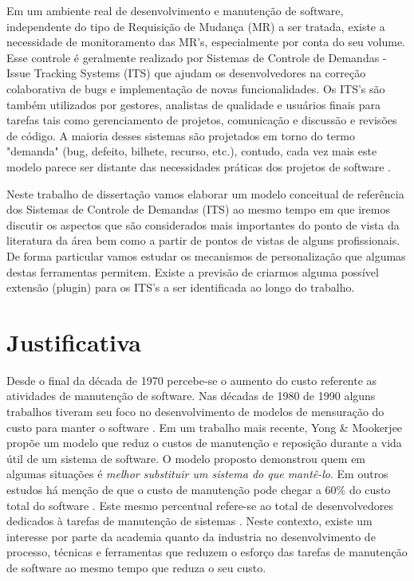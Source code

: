 \documentclass[msc,proposal,hidelot,hideabstract]{ppgccufmg} %
\begin{document}
Em  um ambiente real de desenvolvimento e manutenção de software, independente do tipo
de Requisição de Mudança (MR) a ser tratada, existe a necessidade de
monitoramento das MR's, especialmente por conta do seu volume. Esse controle é geralmente realizado
por Sistemas de Controle de Demandas - Issue Tracking Systems (ITS) que ajudam
os desenvolvedores na correção colaborativa de bugs e
implementação de novas funcionalidades.  Os ITS's são também utilizados por gestores, analistas de qualidade  e usuários finais para
tarefas tais como gerenciamento de projetos, comunicação e discussão e revisões
de código. A maioria desses sistemas são projetados em torno do termo "demanda"
(bug, defeito, bilhete, recurso, etc.), contudo, cada vez mais este modelo parece
ser distante das necessidades práticas dos projetos de software \cite{Baysal:2013:SAP:2486788.2486957}.

Neste trabalho de dissertação vamos elaborar um modelo conceitual de referência
dos Sistemas de Controle de Demandas (ITS) ao mesmo tempo em que iremos discutir os aspectos que
são considerados mais importantes do ponto de vista da literatura da área bem como a partir de pontos de vistas de alguns
profissionais. De forma particular vamos estudar os mecanismos de
personalização que algumas destas ferramentas permitem. Existe a previsão de
criarmos alguma possível extensão (plugin) para os ITS's  a ser identificada ao
longo do trabalho.


\chapter{Justificativa}
\label{ch:justificativa}
Desde o final da década de 1970 \cite{Zelkowitz:1979:PSE:578504} percebe-se o aumento do custo referente as
atividades de  manutenção de software. Nas décadas de 1980 de 1990 alguns
trabalhos tiveram seu foco no desenvolvimento de modelos de mensuração do custo
para manter o software \cite{Herrin:1985:SMC:323287.323383,hirota1994approach}.
Em um trabalho mais recente, Yong \& Mookerjee \cite{1423995}  propõe um modelo que reduz o custos de
manutenção e reposição durante a vida útil de um sistema de software. O modelo
proposto demonstrou quem em algumas situações é \textit{melhor substituir um
  sistema do que mantê-lo}. Em outros estudos há menção de que o custo de
manutenção pode chegar a 60\% do custo total do software \cite{kaur2015review}. Este mesmo percentual
refere-se ao total de desenvolvedores dedicados à tarefas de manutenção de
sistemas \cite{Zhang_2003}. Neste contexto, existe um interesse por parte da
academia quanto da industria no desenvolvimento de processo, técnicas e ferramentas que reduzem o esforço das
tarefas de manutenção de software ao mesmo tempo que reduza o seu custo.
\end{document}

